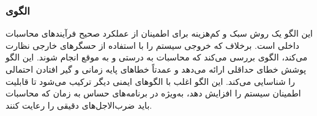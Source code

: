 \subsubsection{الگوی }
\label{archSafeWatchDogSec}
\begin{RTL}
این الگو یک روش سبک و کم‌هزینه برای اطمینان از عملکرد صحیح فرآیندهای
محاسبات داخلی است. برخلاف 
که خروجی سیستم را با استفاده از حسگرهای خارجی نظارت می‌کند،
الگوی  بررسی می‌کند که محاسبات
به درستی و به موقع انجام شوند. این الگو پوشش خطای حداقلی ارائه می‌دهد
و عمدتاً خطاهای پایه زمانی و گیر افتادن احتمالی را شناسایی می‌کند.
این الگو اغلب با الگوهای ایمنی دیگر ترکیب می‌شود تا قابلیت اطمینان سیستم
را افزایش دهد، به‌ویژه در برنامه‌های حساس به زمان که محاسبات
باید ضرب‌الاجل‌های دقیقی را رعایت کنند.
\end{RTL}